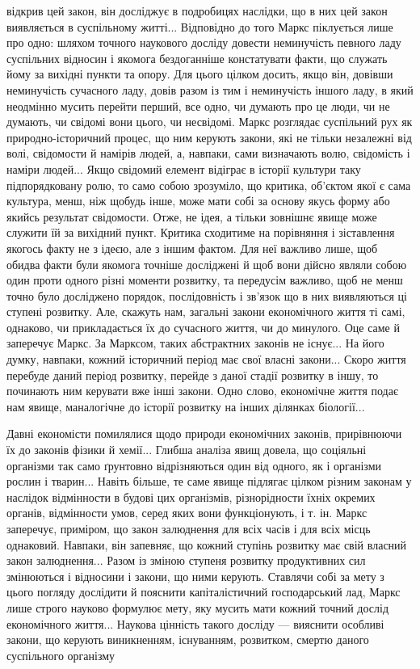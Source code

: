 \parcont{}  %
відкрив цей закон, він досліджує в подробицях наслідки, що в
них цей закон виявляється в суспільному житті... Відповідно до
того Маркс піклується лише про одно: шляхом точного наукового
досліду довести неминучість певного ладу суспільних відносин
і якомога бездоганніше констатувати факти, що служать йому
за вихідні пункти та опору. Для цього цілком досить, якщо він,
довівши неминучість сучасного ладу, довів разом із тим і неминучість
іншого ладу, в який неодмінно мусить перейти перший, все
одно, чи думають про це люди, чи не думають, чи свідомі вони
цього, чи несвідомі. Маркс розглядає суспільний рух як природно-історичний
процес, що ним керують закони, які не тільки незалежні
від волі, свідомости й намірів людей, а, навпаки, сами
визначають волю, свідомість і наміри людей... Якщо свідомий
елемент відіграє в історії культури таку підпорядковану ролю,
то само собою зрозуміло, що критика, об’єктом якої є сама культура,
менш, ніж щобудь інше, може мати собі за основу якусь форму
або якийсь результат свідомости. Отже, не ідея, а тільки зовнішнє
явище може служити їй за вихідний пункт. Критика сходитиме
на порівняння і зіставлення якогось факту не з ідеєю, але з іншим
фактом. Для неї важливо лише, щоб обидва факти були якомога
точніше досліджені й щоб вони дійсно являли собою один проти
одного різні моменти розвитку, та передусім важливо, щоб не
менш точно було досліджено порядок, послідовність і зв’язок
що в них виявляються ці ступені розвитку. Але, скажуть нам,
загальні закони економічного життя ті самі, однаково, чи
прикладається їх до сучасного життя, чи до минулого. Оце саме
й заперечує Маркс. За Марксом, таких абстрактних законів не
існує... На його думку, навпаки, кожний історичний період має
свої власні закони... Скоро життя перебуде даний період розвитку,
перейде з даної стадії розвитку в іншу, то починають ним керувати
вже інші закони. Одно слово, економічне життя подає нам
явище, маналогічне до історії розвитку на інших ділянках біології...

Давні економісти помилялися щодо природи економічних законів,
прирівнюючи їх до законів фізики й хемії... Глибша аналіза
явищ довела, що соціяльні організми так само ґрунтовно відрізняються
один від одного, як і організми рослин і тварин... Навіть
більше, те саме явище підлягає цілком різним законам у наслідок
відмінности в будові цих організмів, різнорідности їхніх окремих
органів, відмінности умов, серед яких вони функціонують, і т. ін.
Маркс заперечує, приміром, що закон залюднення для всіх часів
і для всіх місць однаковий. Навпаки, він запевняє, що кожний
ступінь розвитку має свій власний закон залюднення... Разом із
зміною ступеня розвитку продуктивних сил змінюються і відносини
і закони, що ними керують. Ставлячи собі за мету з цього
погляду дослідити й пояснити капіталістичний господарський лад,
Маркс лише строго науково формулює мету, яку мусить мати
кожний точний дослід економічного життя... Наукова цінність
такого досліду — вияснити особливі закони, що керують виникненням,
існуванням, розвитком, смертю даного суспільного організму
\parbreak{}  %
